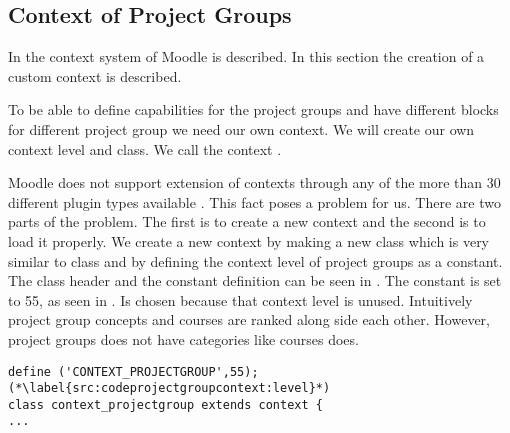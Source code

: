 \subsection{Context of Project Groups}
In   the context system of Moodle is described.
In this section the creation of a custom context is described. 

To be able to define capabilities for the project groups and have different blocks for different project group we need our own context.
We will create our own context level and class.
We call the context . 

Moodle does not support extension of contexts through any of the more than 30 different plugin types available \cite{plugin}. 
This fact poses a problem for us.
There are two parts of the problem.
The first is to create a new context and the second is to load it properly. 
We create a new context by making a new class which is very similar to  class and by defining the context level of project groups as a constant. 
The class header and the constant definition can be seen in . 
The constant is set to 55, as seen in .
Is chosen because that context level is unused.
Intuitively project group concepts and courses are ranked along side each other.
However, project groups does not have categories like courses does.

\begin{lstlisting}[style=phpCode, caption=\myCaption{The context\_projectgroup class header and constant definition}, label=src:codeprojectgroupcontext]
define ('CONTEXT_PROJECTGROUP',55); (*\label{src:codeprojectgroupcontext:level}*)
class context_projectgroup extends context {
...
\end{lstlisting}

